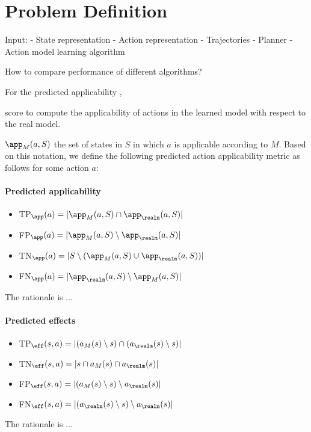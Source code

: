 \section{Problem Definition}

Input: 
- State representation
- Action representation
- Trajectories
- Planner
- Action model learning algorithm


How to compare performance of different algorithms?








For the predicted applicability , 




score to compute the applicability of actions in the learned model with respect to the real model. 

 $\app_M(a,S)$ the set of states in $S$ in which $a$ is applicable according to $M$. Based on this notation, we define the following predicted action applicability metric as follows for some action $a$:

\paragraph{Predicted applicability}
\begin{itemize}
    \item TP$_{\app}(a)=|\app_M(a,S)\cap \app_\realm(a,S)|$
    \item FP$_{\app}(a)=|\app_M(a,S)\setminus \app_\realm(a,S)|$ 
    \item TN$_{\app}(a)=|S\setminus (\app_M(a,S)\cup \app_\realm(a,S))|$
    \item FN$_{\app}(a)=|\app_\realm(a,S)\setminus \app_M(a,S)|$
\end{itemize}
The rationale is ...
\paragraph{Predicted effects}
\begin{itemize}
    \item TP$_{\eff}(s,a)=|(a_M(s)\setminus s)\cap (a_\realm(s)\setminus s)|$
    \item TN$_{\eff}(s,a)=|s \cap a_M(s) \cap a_\realm(s)|$
    \item FP$_{\eff}(s,a)=|(a_M(s)\setminus s)\setminus a_\realm(s)|$
    \item FN$_{\eff}(s,a)=|(a_\realm(s)\setminus s)\setminus a_\realm(s)|$
\end{itemize}
The rationale is ...



